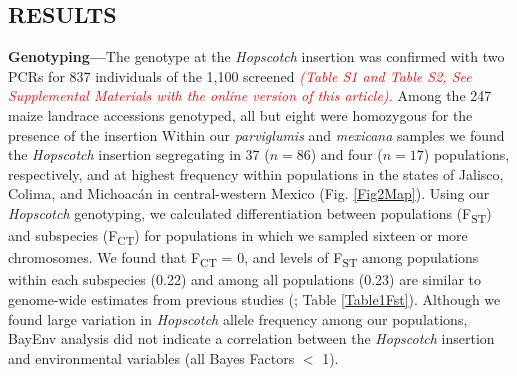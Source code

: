 \documentclass[11pt]{article} %
\newcommand{\track}[1]{\textcolor{red}{\emph{\normalsize #1}} }
\begin{document}
\begin{linenumbers}
\begin{flushleft}
\begin{centering}
\section*{RESULTS}
\end{centering}

\textbf{Genotyping---}The genotype at the \emph{Hopscotch} insertion was confirmed with two PCRs for 837 individuals of the 1,100 screened \track{(Table S1 and Table S2, See Supplemental Materials with the online version of this article).}Among the 247 maize landrace accessions genotyped, all but eight were homozygous for the presence of the insertion Within our \emph{parviglumis} and \emph{mexicana} samples we found the \emph{Hopscotch} insertion segregating in 37 ($n=86$) and four ($n=17$) populations, respectively, and at highest frequency within populations in the states of Jalisco, Colima, and Michoac\'{a}n in central-western Mexico (Fig. \ref{Fig2Map}). Using our \emph{Hopscotch} genotyping, we calculated differentiation between populations (F\textsubscript{ST}) and subspecies (F\textsubscript{CT}) for populations in which we sampled sixteen or more chromosomes. We found that F\textsubscript{CT} = 0, and levels of F\textsubscript{ST} among populations within each subspecies (0.22) and among all populations (0.23) are similar to genome-wide estimates from previous studies (\citealt{Pyhajarvi2013}; Table \ref{Table1Fst}). Although we found large variation in \emph{Hopscotch} allele frequency among our populations, BayEnv analysis did not indicate a correlation between the \emph{Hopscotch} insertion and environmental variables (all Bayes Factors $<$ 1). 


\end{flushleft}
\end{linenumbers}
\end{document}
